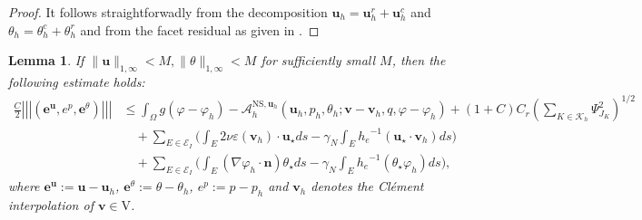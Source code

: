 \documentclass[10pt,a4paper]{article}
\newtheorem{lemma} {\bf Lemma}
\begin{document}
 \begin{proof}
     It follows straightforwadly from the decomposition $ \boldsymbol{u}_h = \boldsymbol{u}_h^r + \boldsymbol{u}_h^c$ and $\theta_h = \theta_h^c + \theta_h^r$ and from the facet residual as given in \cite{ MR2532864}. 
 \end{proof}    
 \begin{lemma}\label{SRL2}
    If $\| \boldsymbol{u}\|_{1,\infty} < M, \| \theta \|_{1,\infty} < M$ for sufficiently small $M$, then the following estimate holds:
  \begin{align*}
  \frac{C}{2} \left|\!\left|\!\left| ( \boldsymbol{e}^{\boldsymbol{u}} , e^p,  \boldsymbol{e}^{\theta}) \right|\!\right|\!\right| & \leq \int_{\Omega} g ( \varphi - \varphi_h )   - \mathcal{A}_h^{\mathrm{NS},\boldsymbol{u}_h}(\boldsymbol{u}_h,p_h, \theta_h; \boldsymbol{v}-\boldsymbol{v}_h,q, \varphi - \varphi_h ) + (1+C) C_r \left( \sum_{K \in \mathcal{K}_h} \Psi_{J_K}^2  \right)^{1/2} \\ & \quad +  \sum_{E\in \mathcal{E}_I}\bigg(\int_{E} 2 \nu \varepsilon(\boldsymbol{v}_h) \cdot \boldsymbol{u}_{\star} d s - \gamma_N \int_{E} {h_e}^{-1}(\boldsymbol{u}_{\star} \cdot \boldsymbol{v}_h) d s  \bigg) \\ & \quad + \sum_{E\in \mathcal{E}_I}\bigg(\int_{E} (\nabla \varphi_h \cdot \boldsymbol{n}) \theta_{\star} d s - \gamma_N \int_{E} {h_e}^{-1}(\theta_{\star} \varphi_h)d s \bigg),
 \end{align*}
  where $\boldsymbol{e}^{\boldsymbol{u}} := \boldsymbol{u} - \boldsymbol{u}_h$, $\boldsymbol{e}^{\theta} := \theta - \theta_h$, $e^p:= p-p_h$ and $\boldsymbol{v}_h$ denotes the Cl\'{e}ment interpolation \cite{MR400739} of $\boldsymbol{v} \in \mathrm{V}$.
\end{lemma}
\end{document}

